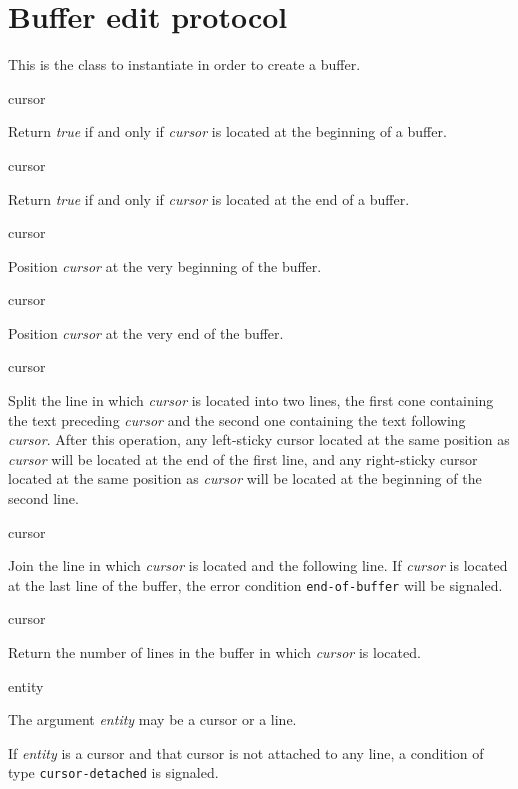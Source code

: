 \section{Buffer edit protocol}
\label{sec-buffer-edit-protocol}


This is the class to instantiate in order to create a buffer.

 {cursor}

Return \textit{true} if and only if \textit{cursor} is located at the
beginning of a buffer.

 {cursor}

Return \textit{true} if and only if \textit{cursor} is located at the
end of a buffer.

 {cursor}

Position \textit{cursor} at the very beginning of the buffer.

 {cursor}

Position \textit{cursor} at the very end of the buffer.

 {cursor}

Split the line in which \textit{cursor} is located into two lines, the
first cone containing the text preceding \textit{cursor} and the
second one containing the text following \textit{cursor}.  After this
operation, any left-sticky cursor located at the same position as
\textit{cursor} will be located at the end of the first line, and any
right-sticky cursor located at the same position as \textit{cursor}
will be located at the beginning of the second line.

 {cursor}

Join the line in which \textit{cursor} is located and the following
line.  If \textit{cursor} is located at the last line of the buffer,
the error condition \texttt{end-of-buffer} will be signaled.

 {cursor}

Return the number of lines in the buffer in which \textit{cursor} is
located.

 {entity}

The argument \textit{entity} may be a cursor or a line.

If \textit{entity} is a cursor and that cursor is not attached to any
line, a condition of type \texttt{cursor-detached} is signaled.

